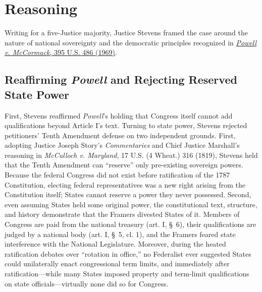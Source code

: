 \documentclass[12pt]{article}
\begin{document}
\section{Reasoning}

Writing for a five-Justice majority, Justice Stevens framed the case around the nature of national sovereignty and the democratic principles recognized in \href{https://supreme.justia.com/cases/federal/us/395/486/}{\textit{Powell v. McCormack}, 395 U.S. 486 (1969)}.

\subsection{Reaffirming \textit{Powell} and Rejecting Reserved State Power}
First, Stevens reaffirmed \textit{Powell}'s holding that Congress itself cannot add qualifications beyond Article I's text. Turning to state power, Stevens rejected petitioners' Tenth Amendment defense on two independent grounds. First, adopting Justice Joseph Story's \textit{Commentaries} and Chief Justice Marshall's reasoning in \textit{McCulloch v. Maryland}, 17 U.S. (4 Wheat.) 316 (1819), Stevens held that the Tenth Amendment can ``reserve'' only pre-existing sovereign powers. Because the federal Congress did not exist before ratification of the 1787 Constitution, electing federal representatives was a new right arising from the Constitution itself; States cannot reserve a power they never possessed. Second, even assuming States held some original power, the constitutional text, structure, and history demonstrate that the Framers divested States of it. Members of Congress are paid from the national treasury (art. I, \S~6), their qualifications are judged by a national body (art. I, \S~5, cl. 1), and the Framers feared state interference with the National Legislature. Moreover, during the heated ratification debates over ``rotation in office,'' no Federalist ever suggested States could unilaterally enact congressional term limits, and immediately after ratification---while many States imposed property and term-limit qualifications on state officials---virtually none did so for Congress.
\end{document}

